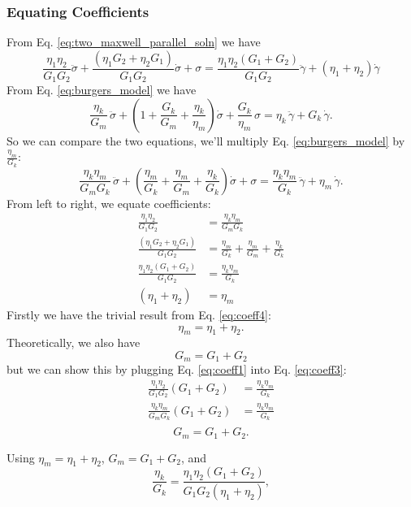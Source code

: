 \subsubsection{Equating Coefficients}
From Eq. \ref{eq:two_maxwell_parallel_soln} we have
\[
	\frac{\eta_1\eta_2}{G_1G_2} \ddot\sigma
	+ \frac{(\eta_1 G_2 + \eta_2 G_1)}{G_1G_2} \dot\sigma
	+ \sigma
		= \frac{\eta_1\eta_2(G_1 + G_2)}{G_1G_2} \ddot\gamma
			    + (\eta_1 + \eta_2)\dot\gamma
\]
From Eq. \ref{eq:burgers_model} we have
\[
	\frac{\eta_k}{G_m}\,\ddot\sigma
	+ \left(1 + \frac{G_k}{G_m} + \frac{\eta_k}{\eta_m}\right)\dot\sigma
	+ \frac{G_k}{\eta_m}\,\sigma
	= \eta_k\,\ddot\gamma + G_k\,\dot\gamma.
\]
So we can compare the two equations, we'll multiply Eq. \ref{eq:burgers_model} by $\frac{\eta_m}{G_k}$:
\[
	\frac{\eta_k \eta_m}{G_m G_k}\,\ddot\sigma
	+ \left(\frac{\eta_m}{G_k} + \frac{\eta_m}{G_m} + \frac{\eta_k}{G_k}\right)\dot\sigma
	+ \sigma
	= \frac{\eta_k \eta_m}{G_k}\,\ddot\gamma + \eta_m\,\dot\gamma.
\]
From left to right, we equate coefficients:
\begin{align}
	\frac{\eta_1\eta_2}{G_1G_2}
	&= \frac{\eta_k \eta_m}{G_m G_k} \label{eq:coeff1} \\
	\frac{(\eta_1 G_2 + \eta_2 G_1)}{G_1G_2}
	&= \frac{\eta_m}{G_k} + \frac{\eta_m}{G_m} + \frac{\eta_k}{G_k} \label{eq:coeff2} \\
	\frac{\eta_1\eta_2(G_1 + G_2)}{G_1G_2}
	&= \frac{\eta_k \eta_m}{G_k} \label{eq:coeff3} \\
	(\eta_1 + \eta_2)
	&= \eta_m \label{eq:coeff4}
\end{align}
Firstly we have the trivial result from Eq. \ref{eq:coeff4}:
\begin{equation*}
	\boxed{\eta_m = \eta_1 + \eta_2}.
\end{equation*}
Theoretically, we also have
\begin{equation*}
	G_m = G_1 + G_2
\end{equation*}
but we can show this by plugging Eq. \ref{eq:coeff1} into Eq. \ref{eq:coeff3}:
\begin{align*}
	\frac{\eta_1\eta_2}{G_1G_2}(G_1 + G_2)
	&= \frac{\eta_k \eta_m}{G_k} \\
	\frac{\eta_k \eta_m}{G_m G_k}(G_1 + G_2)
	&= \frac{\eta_k \eta_m}{G_k} \\
\end{align*}
\begin{equation*}
	\boxed{G_m = G_1 + G_2}.
\end{equation*}

Using $\eta_m=\eta_1+\eta_2$, $G_m=G_1+G_2$, and
\[
	\frac{\eta_k}{G_k}
	=
	\frac{\eta_1\eta_2(G_1+G_2)}{G_1G_2(\eta_1+\eta_2)},
\]

